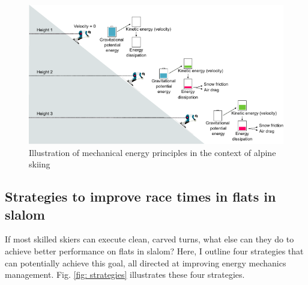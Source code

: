 \begin{figure}[H]
    \centering
    \includegraphics[width=1\linewidth]{figure/figure_introduction_mechenergy3.pdf}
    \caption{Illustration of mechanical energy principles in the context of alpine skiing}
    \label{fig: energy}
\end{figure}



\subsection{Strategies to improve race times in flats in slalom}\label{introduction: strategies}
If most skilled skiers can execute clean, carved turns, what else can they do to achieve better performance on flats in slalom? Here, I outline four strategies that can potentially achieve this goal, all directed at improving energy mechanics management.  Fig. \ref{fig: strategies} illustrates these four strategies.  

